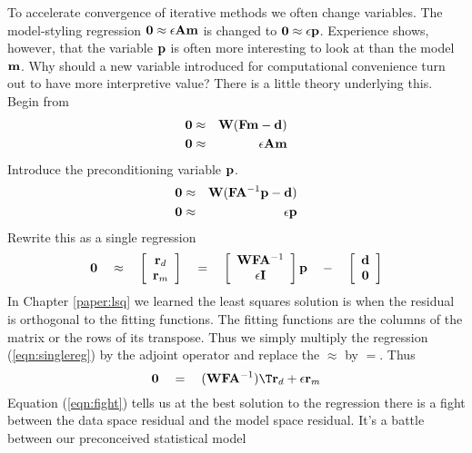 To accelerate convergence of iterative methods we often change variables.
The model-styling regression $\bold 0 \approx \epsilon \bold A \bold m$
is changed to $\bold 0 \approx \epsilon \bold p$.
Experience shows, however, that the variable $\bold p$ is often more interesting
to look at than the model $\bold m$.
Why should a new variable introduced for computational convenience
turn out to have more interpretive value?
There is a little theory underlying this.  Begin from
\begin{eqnarray}
\bold 0 &\approx& \bold W (\bold F \bold m -\bold d)
\\
\bold 0 &\approx& \epsilon \bold A \bold m
\end{eqnarray}
Introduce the preconditioning variable $\bold p$.
\begin{eqnarray}
\bold 0 &\approx& \bold W (\bold F \bold A^{-1}\bold p -\bold d)
\\
\bold 0 &\approx& \epsilon \bold p
\end{eqnarray}
Rewrite this as a single regression
\begin{equation}
\label{eqn:singlereg}
\bold 0 
\quad\approx\quad
\left[
\begin{array}{c}
\bold r_d \\
\bold r_m
\end{array}
\right]
\quad=\quad
\left[
\begin{array}{c}
\bold W\bold F\bold A^{-1} \\
\epsilon \bold I
\end{array}
\right]
\bold p
\quad - \quad
\left[
\begin{array}{c}
\bold d \\
\bold 0
\end{array}
\right]
\end{equation}
In Chapter \ref{paper:lsq} we learned the least squares solution
is when the residual is orthogonal to the fitting functions.
The fitting functions are the columns of the matrix or the rows of its transpose.
Thus we simply multiply the regression
(\ref{eqn:singlereg})
by the adjoint operator and replace the $\approx$ by $=$.
Thus
\begin{equation}
\label{eqn:fight}
\bold 0 \quad=\quad (\bold W\bold F\bold A^{-1})\T\bold r_d + \epsilon \bold r_m 
\end{equation}
Equation (\ref{eqn:fight}) tells us at the best solution to the regression
there is a fight between the data space residual and the model space residual.
It's a battle between our preconceived statistical model
